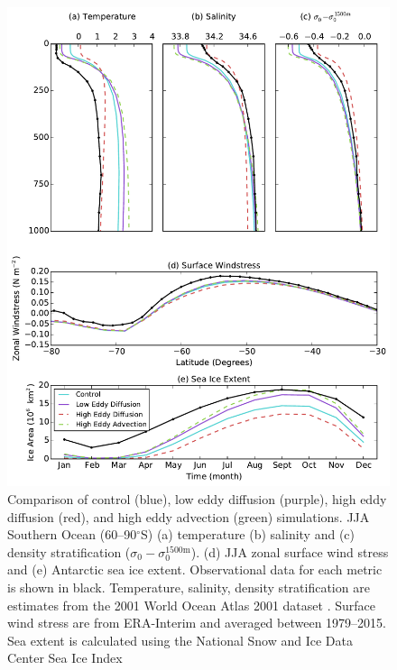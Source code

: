 \begin{figure}
\centering
\includegraphics[width=33pc]{figure1.pdf}
\caption{Comparison of control (blue), low eddy diffusion (purple), high eddy
diffusion (red), and high eddy advection (green) simulations. JJA Southern Ocean
(60--90$^{\circ}$S) (a) temperature
(b) salinity and (c) density stratification
($\sigma_0 - \sigma_0^{\mathrm{1500m}}$). (d) JJA zonal surface wind stress
and (e) Antarctic sea ice extent. Observational data for each metric is shown in
black. Temperature, salinity, density stratification are estimates from the 2001
World Ocean Atlas 2001 dataset \citep{Boyer2002}. Surface wind stress are from ERA-Interim and averaged
between 1979--2015. Sea extent is calculated using the National Snow and Ice Data
Center Sea Ice Index \citep{Fetterer2016}}
\label{fig:climatology}
\end{figure}

